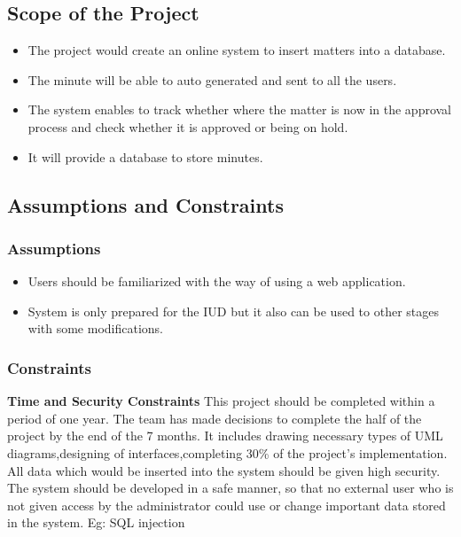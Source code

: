 \documentclass[a4paper,beamer]{article}
\begin{document}
	\subsection{Scope of the Project}
	\begin{itemize}
		\item The project would create an online system to insert matters into a database.
		\item The minute will be able to auto generated and sent to all the users.
		\item The system enables to track whether where the matter is now in the approval process and check whether it is approved or being on hold.
		\item It will provide a database to store minutes.
	\end{itemize}
	
	\subsection{Assumptions and Constraints}
	
	\subsubsection{Assumptions}
	\begin{itemize}
		\item Users should be familiarized with the way of using a web application.
		\item System is only prepared for the IUD but it also can be used to other stages with some modifications.
	\end{itemize}
	
	\subsubsection{Constraints}
	\textbf{Time and Security Constraints} \newline
	This project should be completed within a period of one year. The team has made decisions to complete the half of the project by the end of the 7  months. It includes drawing necessary types of UML diagrams,designing of interfaces,completing 30\% of the project’s implementation.\newline
	All data which would be inserted into the system should be given high security. The system should be developed in a safe manner, so that no external user who is not given access by the administrator could use or change important data stored in the system. Eg: SQL injection\newpage
	
\end{document}
